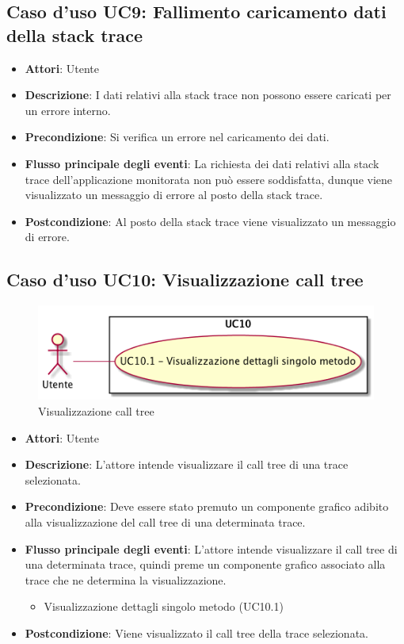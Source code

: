 \subsection{Caso d'uso UC9: Fallimento caricamento dati della stack trace}
\begin{itemize}
	\item \textbf{Attori}: Utente
	\item \textbf{Descrizione}: I dati relativi alla stack trace non possono essere caricati per un errore interno.
	\item \textbf{Precondizione}: Si verifica un errore nel caricamento dei dati.
	\item \textbf{Flusso principale degli eventi}: La richiesta dei dati relativi alla stack trace dell'applicazione monitorata non può essere soddisfatta, dunque viene visualizzato un messaggio di errore al posto della stack trace.
	\item \textbf{Postcondizione}: Al posto della stack trace viene visualizzato un messaggio di errore.
\end{itemize}
\subsection{Caso d'uso UC10: Visualizzazione call tree}
\begin{figure} [H]
	\centering
	\includegraphics[scale=0.45]{./UC/UC10.png}
	\caption{Visualizzazione call tree}\label{}
\end{figure}
\begin{itemize}
	\item \textbf{Attori}: Utente
	\item \textbf{Descrizione}: L'attore intende visualizzare il call tree di una trace selezionata.
	\item \textbf{Precondizione}: Deve essere stato premuto un componente grafico adibito alla visualizzazione del call tree di una determinata trace.
	\item \textbf{Flusso principale degli eventi}: L'attore intende visualizzare il call tree di una determinata trace, quindi preme un componente grafico associato alla trace che ne determina la visualizzazione.
	\begin{itemize}
		\item Visualizzazione dettagli singolo metodo (UC10.1)
	\end{itemize}
	\item \textbf{Postcondizione}: Viene visualizzato il call tree della trace selezionata.
\end{itemize}
